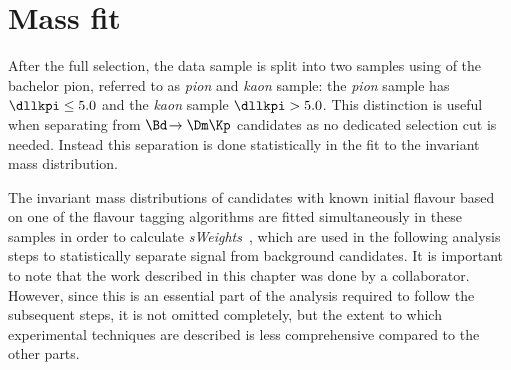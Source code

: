 \chapter{Mass fit}
\label{ch:massfit}

\linespread{1.08}\selectfont

After the full selection, the data sample is split into two samples using \dllkpi of the bachelor pion, referred to as \emph{pion} and \emph{kaon} sample:
the \emph{pion} sample has $\dllkpi\leq5.0$ and the \emph{kaon} sample $\dllkpi>5.0$.
This distinction is useful when separating \mbox{\BdToDpi} from $\Bd\!\to\Dm\Kp$ candidates as no dedicated selection cut is needed.
Instead this separation is done statistically in the fit to the invariant mass distribution.

The invariant \Bz mass distributions of candidates with known initial flavour based on one of the flavour tagging algorithms are fitted simultaneously in these samples in order to calculate \emph{sWeights}~\cite{Pivk:2004ty}, which are used in the following analysis steps to statistically separate signal from background candidates.
It is important to note that the work described in this chapter was done by a collaborator.
However, since this is an essential part of the analysis required to follow the subsequent steps, it is not omitted completely, but the extent to which \eg experimental techniques are described is less comprehensive compared to the other parts.

